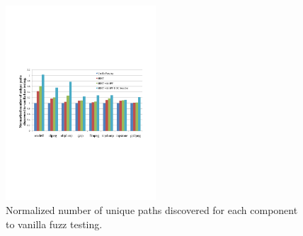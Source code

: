       
\begin{figure}
\begin{center}
\includegraphics[width=0.5\textwidth]{figures/path-discovery-SPF-CS-all.pdf} 
\caption{Normalized number of unique paths discovered for each component to vanilla fuzz testing.}\label{path-overall-rsults}
\end{center}
\end{figure}